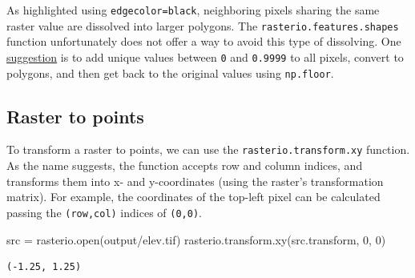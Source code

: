 \documentclass[
  letterpaper,
]{krantz}
\newenvironment{Shaded}{\begin{snugshade}}{\end{snugshade}}
\newcommand{\BuiltInTok}[1]{\textcolor[rgb]{0.00,0.23,0.31}{#1}}
\newcommand{\DecValTok}[1]{\textcolor[rgb]{0.68,0.00,0.00}{#1}}
\newcommand{\NormalTok}[1]{\textcolor[rgb]{0.00,0.23,0.31}{#1}}
\newcommand{\OperatorTok}[1]{\textcolor[rgb]{0.37,0.37,0.37}{#1}}
\newcommand{\StringTok}[1]{\textcolor[rgb]{0.13,0.47,0.30}{#1}}
\begin{document}
As highlighted using
\texttt{edgecolor=\textquotesingle{}black\textquotesingle{}},
neighboring pixels sharing the same raster value are dissolved into
larger polygons. The \texttt{rasterio.features.shapes} function
unfortunately does not offer a way to avoid this type of dissolving. One
\href{https://gis.stackexchange.com/questions/455980/vectorizing-all-pixels-as-separate-polygons-using-rasterio\#answer-456251}{suggestion}
is to add unique values between \texttt{0} and \texttt{0.9999} to all
pixels, convert to polygons, and then get back to the original values
using \texttt{np.floor}.

\subsection{Raster to points}\label{sec-raster-to-points}

To transform a raster to points, we can use the
\texttt{rasterio.transform.xy} function. As the name suggests, the
function accepts row and column indices, and transforms them into x- and
y-coordinates (using the raster's transformation matrix). For example,
the coordinates of the top-left pixel can be calculated passing the
\texttt{(row,col)} indices of \texttt{(0,0)}.

\begin{Shaded}
\begin{Highlighting}[]
\NormalTok{src }\OperatorTok{=}\NormalTok{ rasterio.}\BuiltInTok{open}\NormalTok{(}\StringTok{\textquotesingle{}output/elev.tif\textquotesingle{}}\NormalTok{)}
\NormalTok{rasterio.transform.xy(src.transform, }\DecValTok{0}\NormalTok{, }\DecValTok{0}\NormalTok{)}
\end{Highlighting}
\end{Shaded}

\begin{verbatim}
(-1.25, 1.25)
\end{verbatim}
\end{document}
